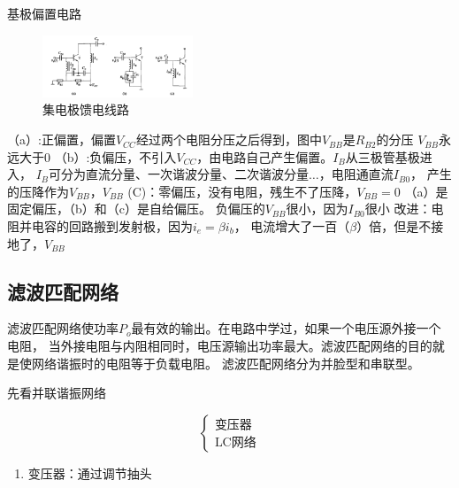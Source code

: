 \documentclass[10pt]{article}
\begin{document}
\begin{example}
基极偏置电路
\begin{figure}[H] %
    \centering %
    \includegraphics[width=0.4\textwidth]{pictures/2-4.png} %
    \caption{集电极馈电线路} %
    \label{fig.2-4}%
\end{figure}
（a）:正偏置，偏置$V_{CC}$经过两个电阻分压之后得到，图中$V_{BB}$是$R_{B2}$的分压
$V_{BB}$永远大于0
（b）:负偏压，不引入$V_{CC}$，由电路自己产生偏置。$I_{B}$从三极管基极进入，
$I_{B}$可分为直流分量、一次谐波分量、二次谐波分量$\dots$，电阻通直流$I_{B0}$，
产生的压降作为$V_{BB}$，$V_{BB}$
(C)：零偏压，没有电阻，残生不了压降，$V_{BB}  = 0$
（a）是固定偏压，（b）和（c）是自给偏压。
负偏压的$V_{BB}$很小，因为$I_{B0}很小$
改进：电阻并电容的回路搬到发射极，因为$i_e = \beta i_b$，
电流增大了一百（$\beta$）倍，但是不接地了，$V_{BB}$
\end{example}
\subsection{滤波匹配网络}
滤波匹配网络使功率$P_o$最有效的输出。在电路中学过，如果一个电压源外接一个电阻，
当外接电阻与内阻相同时，电压源输出功率最大。滤波匹配网络的目的就是使网络谐振时的电阻等于负载电阻。
滤波匹配网络分为并脸型和串联型。
\par 先看并联谐振网络


$$
\left\{  
    \begin{array}{cc}  
        \text{变压器}\\  
        \text{LC网络}
    \end{array}  
\right.  
$$
  \begin{enumerate}
   \item 变压器：通过调节抽头
  \end{enumerate} 
\end{document}
